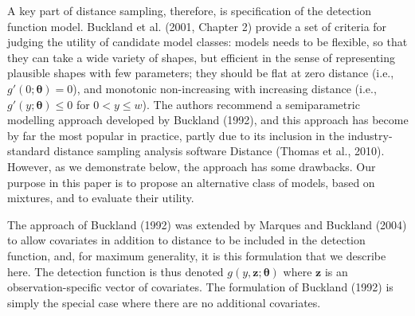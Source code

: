 \documentclass[useAMS,referee]{biom}
\begin{document}
A key part of distance sampling, therefore, is specification of the detection function model.  Buckland et al. (2001, Chapter 2) provide a set of criteria for judging the utility of candidate model classes: models needs to be flexible, so that they can take a wide variety of shapes, but efficient in the sense of representing plausible shapes with few parameters; they should be flat at zero distance (i.e., $g'(0;\bm{\theta})=0$), and monotonic non-increasing with increasing distance (i.e., $g'(y;\bm{\theta}) \leq 0$ for $0<y\leq w$).  The authors recommend a semiparametric modelling approach developed by Buckland (1992), and this approach has become by far the most popular in practice, partly due to its inclusion in the industry-standard distance sampling analysis software Distance (Thomas et al., 2010).  However, as we demonstrate below, the approach has some drawbacks.  Our purpose in this paper is to propose an alternative class of models, based on mixtures, and to evaluate their utility.

The approach of Buckland (1992) was extended by Marques and Buckland (2004) to allow covariates in addition to distance to be included in the detection function, and, for maximum generality, it is this formulation that we describe here.  The detection function is thus denoted $g(y, \mathbf{z};\bm{\theta})$ where $\mathbf{z}$ is an observation-specific vector of covariates.  The formulation of Buckland (1992) is simply the special case where there are no additional covariates.
\end{document}
